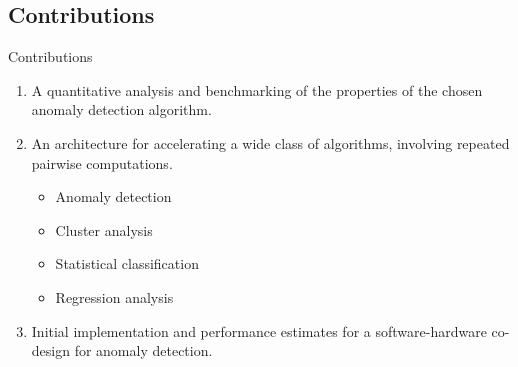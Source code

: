 \subsection{Contributions}
\begin{frame}{Contributions}

    \begin{enumerate}
        \item<2-> A quantitative analysis and benchmarking of the properties of
            the chosen anomaly detection algorithm.

        \bigskip
        \item<3-> An architecture for accelerating a wide class of algorithms,
            involving repeated pairwise computations.
        \begin{itemize}
            \item<3-> Anomaly detection

            \item<3-> Cluster analysis

            \item<3-> Statistical classification

            \item<3-> Regression analysis
        \end{itemize}

        \bigskip
        \item<4-> Initial implementation and performance estimates for a
            software-hardware co-design for anomaly detection.
    \end{enumerate}
\end{frame}
